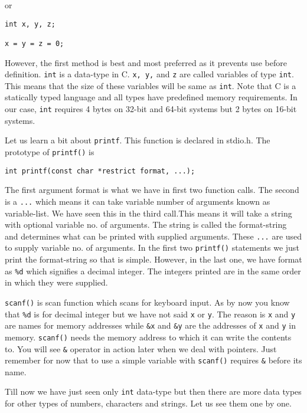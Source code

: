 or

\begin{verbatim}
int x, y, z;

x = y = z = 0;
\end{verbatim}

However, the first method is best and most preferred as it prevents use before
definition. \texttt{int} is a data-type in C. \texttt{x, y,} and \texttt{z} are
called variables of type \texttt{int}. This means that the size of these
variables will be same as \texttt{int}. Note that 
C is a statically typed language and all types have predefined memory
requirements. In our case, \texttt{int} requires 4 bytes on 32-bit and 64-bit
systems but 2 bytes on 16-bit systems.

Let us learn a bit about \texttt{printf}. This function is declared in
stdio.h. The prototype of \texttt{printf()} is

\begin{verbatim}
int printf(const char *restrict format, ...);
\end{verbatim}

The first argument format is what we have in first two function calls. The
second is a \texttt{...} which means it can take variable number of arguments
known as variable-list. We have seen this in the third call.This means it will
take a string with optional variable no. of arguments. The string is called the
format-string and determines what can be printed with supplied arguments. These
\texttt{...} are used to supply variable no. of arguments. In the first two
\texttt{printf()} statements we just print the format-string so that is
simple. However, in the last one, we have format as \texttt{\%d} which
signifies a decimal integer. The integers printed are in the same order in
which they were supplied.

\texttt{scanf()} is scan function which scans for keyboard input. As by now you
know that \texttt{\%d} is for decimal integer but we have not said \texttt{x}
or \texttt{y}. The reason is \texttt{x} and \texttt{y} are names for memory
addresses while
\texttt{\&x} and \texttt{\&y} are the addresses of \texttt{x} and \texttt{y} in
memory. \texttt{scanf()} needs the memory address to which it can write the
contents to. You will see \texttt{\&} operator in action later when we deal
with pointers. Just remember for now that to use a simple variable with
\texttt{scanf()} requires \texttt{\&} before its name.

Till now we have just seen only \texttt{int} data-type but then there are more
data types for other types of numbers, characters and strings. Let us see them
one by one.

